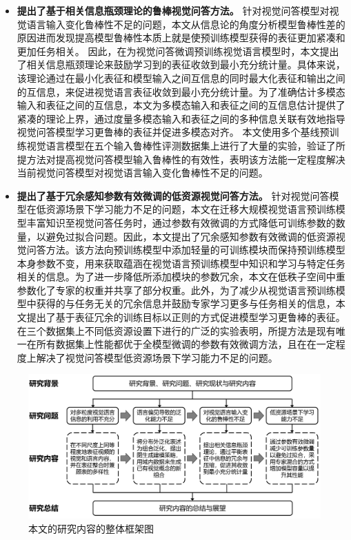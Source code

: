 \begin{itemize}[wide,leftmargin=0pt,itemsep=1pt]
\item \textbf{提出了基于相关信息瓶颈理论的鲁棒视觉问答方法。} 针对视觉问答模型对视觉语言输入变化鲁棒性不足的问题，本文从信息论的角度分析模型鲁棒性差的原因进而发现提高模型鲁棒性本质上就是使预训练模型获得的表征更加紧凑和更加任务相关。
因此，在为视觉问答微调预训练视觉语言模型时，本文提出了相关信息瓶颈理论来鼓励学习到的表征收敛到最小充分统计量。具体来说，该理论通过在最小化表征和模型输入之间互信息的同时最大化表征和输出之间的互信息，来促进视觉语言表征收敛到最小充分统计量。为了准确估计多模态输入和表征之间的互信息，本文为多模态输入和表征之间的互信息估计提供了紧凑的理论上界，通过度量多模态输入和表征之间的多种信息关联有效地指导视觉问答模型学习更鲁棒的表征并促进多模态对齐。
本文使用多个基线预训练视觉语言模型在五个输入鲁棒性评测数据集上进行了大量的实验，验证了所提方法对提高视觉问答模型输入鲁棒性的有效性，表明该方法能一定程度解决当前视觉问答模型对视觉语言输入变化鲁棒性不足的问题。


\item \textbf{提出了基于冗余感知参数有效微调的低资源视觉问答方法。} 针对视觉问答模型在低资源场景下学习能力不足的问题，本文在迁移大规模视觉语言预训练模型丰富知识至视觉问答任务时，通过参数有效微调的方式降低可训练参数的数量，以避免过拟合问题。因此，本文提出了冗余感知参数有效微调的低资源视觉问答方法。该方法向预训练模型中添加轻量的可训练模块而保持预训练模型本身参数不变，用来获取蕴涵在视觉语言预训练模型中知识和学习与特定任务相关的信息。为了进一步降低所添加模块的参数冗余，本文在低秩子空间中重参数化了专家的权重并共享了部分权重。此外，为了减少从视觉语言预训练模型中获得的与任务无关的冗余信息并鼓励专家学习更多与任务相关的信息，本文提出了基于表征冗余的训练目标以正则的方式促进模型学习更鲁棒的表征。在三个数据集上不同低资源设置下进行的广泛的实验表明，所提方法是现有唯一在所有数据集上性能都优于全模型微调的参数有效微调方法，且在在一定程度上解决了视觉问答模型低资源场景下学习能力不足的问题。

\end{itemize}


\begin{figure}[!t]
\centering
\includegraphics[width=1.0\linewidth]{figure/c1_overview.pdf}
\caption{本文的研究内容的整体框架图}
\label{fig:c1_arrangement} 
\end{figure}

